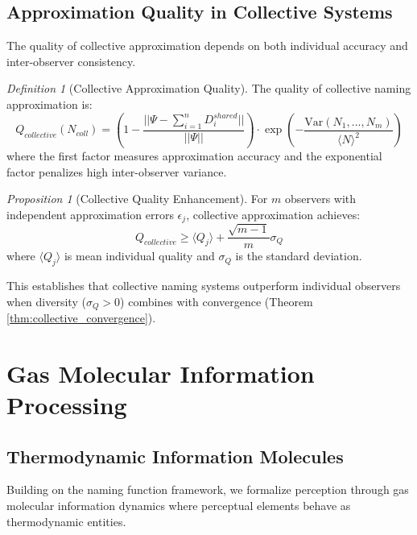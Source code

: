 \documentclass[12pt]{article}
\newtheorem{proposition}[theorem]{Proposition}
\theoremstyle{definition}
\newtheorem{definition}[theorem]{Definition}
\theoremstyle{remark}
\newtheorem{definition}[theorem]{Definition}
\newtheorem{proposition}[theorem]{Proposition}
\begin{document}
\subsection{Approximation Quality in Collective Systems}

The quality of collective approximation depends on both individual accuracy and inter-observer consistency.

\begin{definition}[Collective Approximation Quality]
\label{def:collective_quality}
The quality of collective naming approximation is:
\begin{equation}
\label{eq:collective_quality}
Q_{collective}(N_{coll}) = \left(1 - \frac{||\Psi - \sum_{i=1}^{n} D_i^{shared}||}{||\Psi||}\right) \cdot \exp\left(-\frac{\text{Var}(N_1, ..., N_m)}{\langle N \rangle^2}\right)
\end{equation}
where the first factor measures approximation accuracy and the exponential factor penalizes high inter-observer variance.
\end{definition}

\begin{proposition}[Collective Quality Enhancement]
For $m$ observers with independent approximation errors $\epsilon_j$, collective approximation achieves:
\begin{equation}
Q_{collective} \geq \langle Q_j \rangle + \frac{\sqrt{m-1}}{m} \sigma_Q
\end{equation}
where $\langle Q_j \rangle$ is mean individual quality and $\sigma_Q$ is the standard deviation.
\end{proposition}

This establishes that collective naming systems outperform individual observers when diversity ($\sigma_Q > 0$) combines with convergence (Theorem \ref{thm:collective_convergence}).

\section{Gas Molecular Information Processing}
\label{sec:gas_molecular}

\subsection{Thermodynamic Information Molecules}

Building on the naming function framework, we formalize perception through gas molecular information dynamics where perceptual elements behave as thermodynamic entities.
\end{document}
